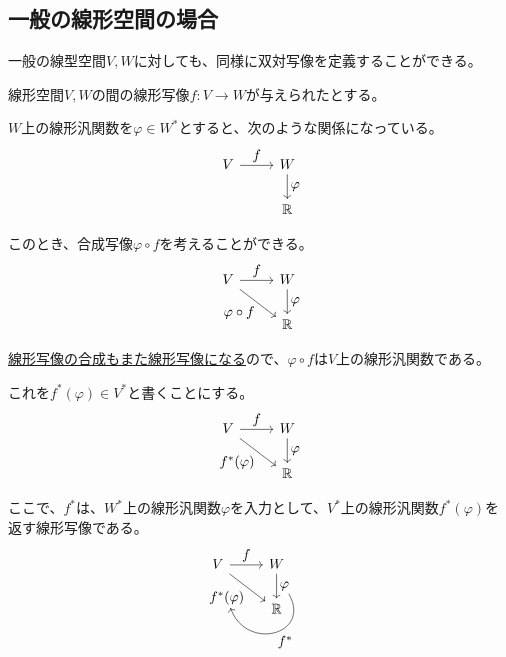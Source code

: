 \documentclass[../../../topic_linear-algebra]{subfiles}
\begin{document}
\subsection{一般の線形空間の場合}

一般の線型空間$V, W$に対しても、同様に双対写像を定義することができる。

\br

線形空間$V,W$の間の線形写像$f \colon V \to W$が与えられたとする。

$W$上の線形汎関数を$\varphi \in W^*$とすると、次のような関係になっている。
\begin{equation*}
  \begin{tikzcd}[every label/.append style = {font = \normalsize}]
    V \arrow[r,"f"] & W \arrow[d,"\varphi"]\\
    & \mathbb{R}
  \end{tikzcd}
\end{equation*}

このとき、合成写像$\varphi \circ f$を考えることができる。
\begin{equation*}
  \begin{tikzcd}[every label/.append style = {font = \normalsize}]
    V \arrow[r,"f"]\arrow[rd, "\varphi \circ f"'] & W \arrow[d,"\varphi"]\\
    & \mathbb{R}
  \end{tikzcd}
\end{equation*}

\hyperref[thm:linear-map-composition]{線形写像の合成もまた線形写像になる}ので、$\varphi \circ f$は$V$上の線形汎関数である。

これを$f^*(\varphi) \in V^*$と書くことにする。
\begin{equation*}
  \begin{tikzcd}[every label/.append style = {font = \normalsize}]
    V \arrow[r,"f"]\arrow[rd, "f^*(\varphi)"'] & W \arrow[d,"\varphi"]\\
    & \mathbb{R}
  \end{tikzcd}
\end{equation*}

ここで、$f^*$は、$W^*$上の線形汎関数$\varphi$を入力として、$V^*$上の線形汎関数$f^*(\varphi)$を返す線形写像である。
\begin{equation*}
  \begin{tikzcd}[every label/.append style = {font = \normalsize}]
    V \arrow[r,"f"]\arrow[rd, "f^*(\varphi)"'{name=v}] & W \arrow[d,"\varphi"{name=w}] \arrow[from=w,to=v,out=-60, in=-70,looseness=2,"f^*"]\\
    & \mathbb{R}
  \end{tikzcd}
\end{equation*}
\end{document}

